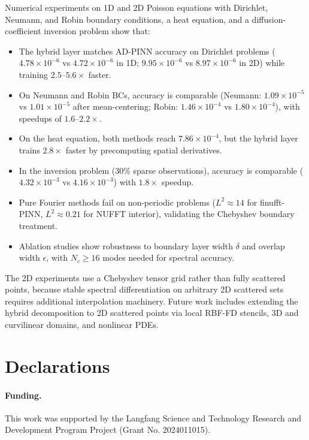 \documentclass[sn-mathphys,Numbered]{sn-jnl}
\theoremstyle{thmstyleone}
\theoremstyle{thmstyletwo}
\theoremstyle{thmstylethree}
\begin{document}
Numerical experiments on 1D and 2D Poisson equations with Dirichlet, Neumann, and Robin boundary conditions, a heat equation, and a diffusion-coefficient inversion problem show that:
\begin{itemize}
    \item The hybrid layer matches AD-PINN accuracy on Dirichlet problems ($4.78\times10^{-6}$ vs $4.72\times10^{-6}$ in 1D; $9.95\times10^{-6}$ vs $8.97\times10^{-6}$ in 2D) while training $2.5$--$5.6\times$ faster.
    \item On Neumann and Robin BCs, accuracy is comparable (Neumann: $1.09\times10^{-5}$ vs $1.01\times10^{-5}$ after mean-centering; Robin: $1.46\times10^{-4}$ vs $1.80\times10^{-4}$), with speedups of $1.6$--$2.2\times$.
    \item On the heat equation, both methods reach $7.86\times10^{-4}$, but the hybrid layer trains $2.8\times$ faster by precomputing spatial derivatives.
    \item In the inversion problem (30\% sparse observations), accuracy is comparable ($4.32\times10^{-3}$ vs $4.16\times10^{-3}$) with $1.8\times$ speedup.
    \item Pure Fourier methods fail on non-periodic problems ($L^2\approx14$ for finufft-PINN, $L^2\approx0.21$ for NUFFT interior), validating the Chebyshev boundary treatment.
    \item Ablation studies show robustness to boundary layer width $\delta$ and overlap width $\epsilon$, with $N_c\geq16$ modes needed for spectral accuracy.
\end{itemize}

The 2D experiments use a Chebyshev tensor grid rather than fully scattered points, because stable spectral differentiation on arbitrary 2D scattered sets requires additional interpolation machinery. Future work includes extending the hybrid decomposition to 2D scattered points via local RBF-FD stencils, 3D and curvilinear domains, and nonlinear PDEs.

\section*{Declarations}

\paragraph{Funding.}
This work was supported by the Langfang Science and Technology Research and Development Program Project (Grant No. 2024011015).
\end{document}
